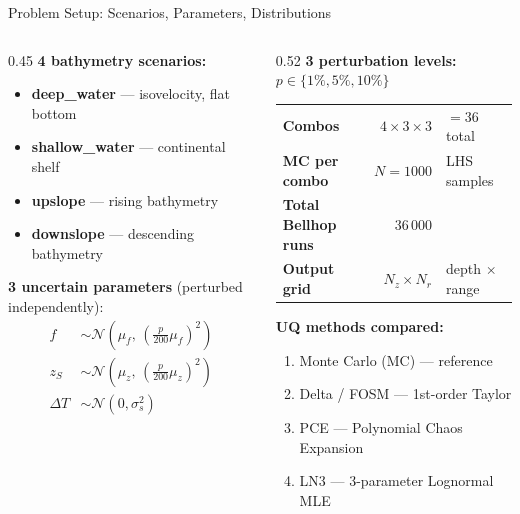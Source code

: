 \documentclass[aspectratio=169,12pt]{beamer}
\begin{document}
\begin{frame}{Problem Setup: Scenarios, Parameters, Distributions}
  \begin{columns}[T]
    \begin{column}{0.45\textwidth}
      \textbf{4 bathymetry scenarios:}
      \begin{itemize}
        \item \textbf{deep\_water} — isovelocity, flat bottom
        \item \textbf{shallow\_water} — continental shelf
        \item \textbf{upslope} — rising bathymetry
        \item \textbf{downslope} — descending bathymetry
      \end{itemize}

      \vspace{0.6em}
      \textbf{3 uncertain parameters} (perturbed independently):
      \begin{align*}
        f &\sim \mathcal{N}(\mu_f,\,(\tfrac{p}{200}\mu_f)^2)\\
        z_S &\sim \mathcal{N}(\mu_z,\,(\tfrac{p}{200}\mu_z)^2)\\
        \Delta T &\sim \mathcal{N}(0,\sigma_s^2)
      \end{align*}
    \end{column}
    \begin{column}{0.52\textwidth}
      \textbf{3 perturbation levels:} $p\in\{1\%, 5\%, 10\%\}$

      \vspace{0.5em}
      \begin{tabular}{@{}lrl@{}}
        \toprule
        \textbf{Combos} & $4\times3\times3$ & $=36$ total \\
        \textbf{MC per combo} & $N=1000$ & LHS samples \\
        \textbf{Total Bellhop runs} & $36\,000$ & \\
        \textbf{Output grid} & $N_z\times N_r$ & depth $\times$ range \\
        \bottomrule
      \end{tabular}

      \vspace{0.8em}
      \textbf{UQ methods compared:}
      \begin{enumerate}
        \item Monte Carlo (MC) — reference
        \item Delta / FOSM — 1st-order Taylor
        \item PCE — Polynomial Chaos Expansion
        \item LN3 — 3-parameter Lognormal MLE
      \end{enumerate}
    \end{column}
  \end{columns}
\end{frame}
\end{document}
